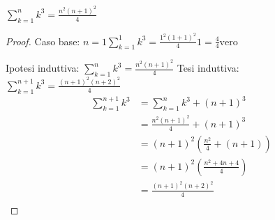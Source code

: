 \begin{thm}
    $\displaystyle \sum _{k=1} ^ n k^3 = \frac{n^2 (n+1)^2}{4}$
\end{thm}

\begin{proof}
Caso base: $n = 1 \sum _{k=1} ^ 1 k^3 = \frac{1^2(1+1)^2}{4} 1 = \frac{4}{4} \text{vero}$

Ipotesi induttiva: $\sum _{k=1} ^ n k^3 = \frac{n^2 (n+1)^2}{4}$
Tesi induttiva: $\sum _{k=1} ^ {n+1} k^3 = \frac{(n+1)^2 (n+2)^2}{4}$
\begin{equation*}
\begin{split}
\sum _{k=1} ^{n+1} k^3 & = \sum _{k=1} ^ n k^3 + (n+1)^3 \\
                       & = \frac{n^2 (n+1)^2}{4} + (n+1)^3 \\
                       & = (n+1)^2 (\frac{n^2}{4} + (n+1)) \\
                       & = (n+1)^2 (\frac{n^2 + 4n + 4}{4}) \\
                       & = \frac{(n+1)^2 (n+2)^2}{4} \\
\end{split}
\end{equation*}
\end{proof}
